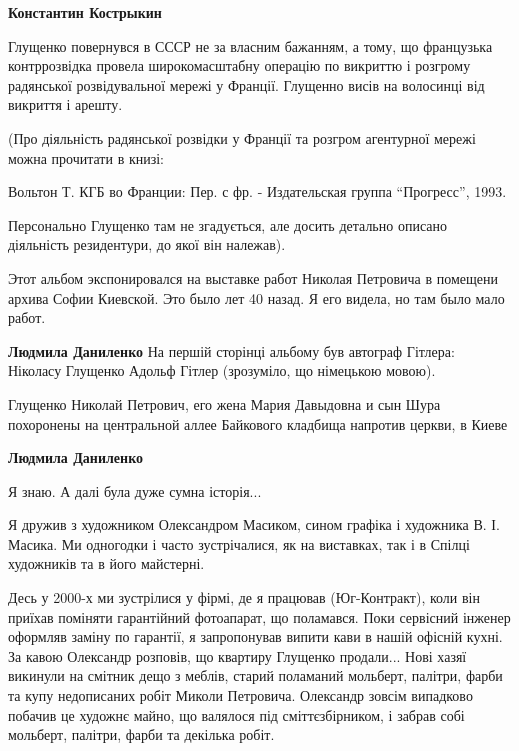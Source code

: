 \begin{itemize}
\begin{itemize}
\textbf{Константин Кострыкин} 

Глущенко повернувся в СССР не за власним бажанням, а тому, що французька
контррозвідка провела широкомасштабну операцію по викриттю і розгрому
радянської розвідувальної мережі у Франції. Глущенно висів на волосинці від
викриття і арешту.

(Про діяльність радянської розвідки у Франції та розгром агентурної мережі
можна прочитати в книзі:

Вольтон Т. КГБ во Франции: Пер. с фр. - Издательская группа \enquote{Прогресс}, 1993.

Персонально Глущенко там не згадується, але досить детально описано діяльність
резидентури, до якої він належав).

\end{itemize} %


Этот альбом экспонировался на выставке работ Николая Петровича в помещени
архива Софии Киевской. Это было лет 40 назад. Я его видела, но там было мало
работ.

\begin{itemize} %
\textbf{Людмила Даниленко} На першій сторінці альбому був автограф Гітлера: Ніколасу Глущенко Адольф Гітлер (зрозуміло, що німецькою мовою).
\end{itemize} %


Глущенко Николай Петрович, его жена Мария Давыдовна и сын Шура похоронены на
центральной аллее Байкового кладбища напротив церкви, в Киеве

\begin{itemize} %
\textbf{Людмила Даниленко} 

Я знаю. А далі була дуже сумна історія...

Я дружив з художником Олександром Масиком, сином графіка і художника В. І.
Масика. Ми одногодки і часто зустрічалися, як на виставках, так і в Спілці
художників та в його майстерні.

Десь у 2000-х ми зустрілися у фірмі, де я працював (Юг-Контракт), коли він
приїхав поміняти гарантійний фотоапарат, що поламався. Поки сервісний інженер
оформляв заміну по гарантії, я запропонував випити кави в нашій офісній кухні.
За кавою Олександр розповів, що квартиру Глущенко продали... Нові хазяї
викинули на смітник дещо з меблів, старий поламаний мольберт, палітри, фарби та
купу недописаних робіт Миколи Петровича. Олександр зовсім випадково побачив це
художнє майно, що валялося під сміттєзбірником, і забрав собі мольберт,
палітри, фарби та декілька робіт.


\end{itemize}
\end{itemize}

